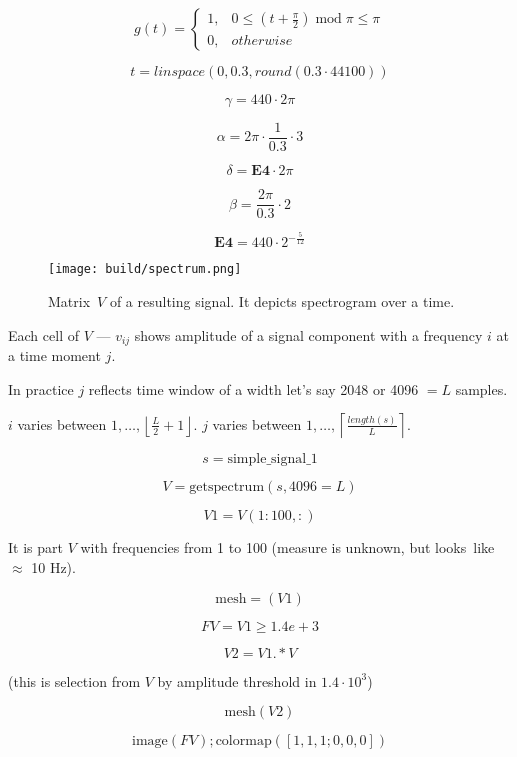 \documentclass{extreport}
\begin{document}
\[
  g(t) =
  \begin{cases}
    1, & 0 \leqslant \left( t + \frac{\pi}{2} \right)
      \; \text{mod} \; \pi \leqslant \pi \\
    0, & otherwise
  \end{cases}
\]

$$t = linspace(0, 0.3, round(0.3 \cdot 44100))$$

$$\gamma = 440 \cdot 2 \pi$$

$$\alpha = 2 \pi \cdot \frac{1}{0.3} \cdot 3$$

$$\delta = \textbf{E4} \cdot 2 \pi$$

$$\beta = \frac{2 \pi}{0.3} \cdot 2$$

$$\textbf{E4} = 440 \cdot 2^{-\frac{5}{12}}$$

\begin{figure}
  \texttt{[image: build/spectrum.png]}
  \caption{Matrix~$V$ of a resulting signal.
  It depicts spectrogram over a time.}
\end{figure}

Each cell of $V$ --- $v_{ij}$ shows amplitude
of a signal component with a frequency $i$
at a time moment $j$.

In practice $j$ reflects time window of a width
let's say 2048 or 4096 $= L$ samples.

$i$ varies between $1, \dots, \left\lfloor \frac{L}{2}+1 \right\rfloor$.
$j$ varies between $1, \dots, \left\lceil \frac{length(s)}{L} \right\rceil$.

$$s = \text{simple\_signal\_1}$$

$$V = \text{getspectrum}(s,4096 = L)$$

$$V1 = V(1:100,:)$$

It is part $V$ with frequencies from 1 to 100 (measure is unknown,
but looks~like $\approx$ 10 Hz).

$$\text{mesh} = (V1)$$

$$FV = V1 \geqslant 1.4e+3$$

$$V2 = V1 .*  V$$

(this is selection from $V$ by amplitude threshold in $1.4 \cdot 10^3$)

$$\text{mesh}(V2)$$

$$\text{image}(FV); \text{colormap}([1, 1, 1; 0, 0, 0])$$
\end{document}
